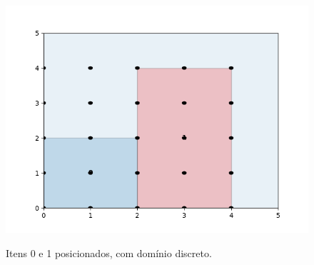\begin{figure}[H]
    \centering
    \caption{Itens 0 e 1 posicionados, com domínio discreto.}
    \includegraphics[scale=0.5]{utils/images/discrete_example}
    \label{fig:sobreposicao-dominio4}
\end{figure}
